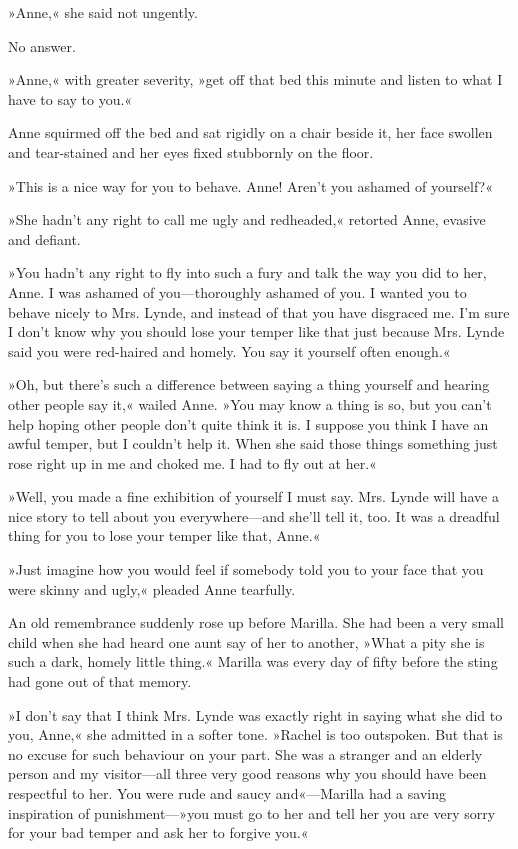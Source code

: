 »Anne,« she said not ungently.

No answer.

»Anne,« with greater severity, »get off that bed this minute and listen to what I have to say to you.«

Anne squirmed off the bed and sat rigidly on a chair beside it, her face swollen and tear-stained and her eyes fixed stubbornly on the floor.

»This is a nice way for you to behave. Anne! Aren't you ashamed of yourself?«

»She hadn't any right to call me ugly and redheaded,« retorted Anne, evasive and defiant.

»You hadn't any right to fly into such a fury and talk the way you did to her, Anne. I was ashamed of you—thoroughly ashamed of you. I wanted you to behave nicely to Mrs. Lynde, and instead of that you have disgraced me. I'm sure I don't know why you should lose your temper like that just because Mrs. Lynde said you were red-haired and homely. You say it yourself often enough.«

»Oh, but there's such a difference between saying a thing yourself and hearing other people say it,« wailed Anne. »You may know a thing is so, but you can't help hoping other people don't quite think it is. I suppose you think I have an awful temper, but I couldn't help it. When she said those things something just rose right up in me and choked me. I had to fly out at her.«

»Well, you made a fine exhibition of yourself I must say. Mrs. Lynde will have a nice story to tell about you everywhere—and she'll tell it, too. It was a dreadful thing for you to lose your temper like that, Anne.«

»Just imagine how you would feel if somebody told you to your face that you were skinny and ugly,« pleaded Anne tearfully.

An old remembrance suddenly rose up before Marilla. She had been a very small child when she had heard one aunt say of her to another, »What a pity she is such a dark, homely little thing.« Marilla was every day of fifty before the sting had gone out of that memory.

»I don't say that I think Mrs. Lynde was exactly right in saying what she did to you, Anne,« she admitted in a softer tone. »Rachel is too outspoken. But that is no excuse for such behaviour on your part. She was a stranger and an elderly person and my visitor—all three very good reasons why you should have been respectful to her. You were rude and saucy and«—Marilla had a saving inspiration of punishment—»you must go to her and tell her you are very sorry for your bad temper and ask her to forgive you.«

